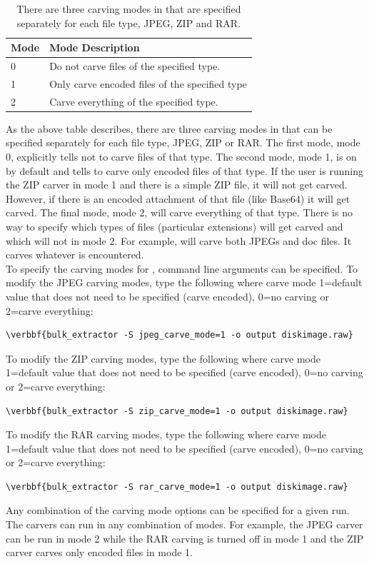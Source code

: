 \documentclass[11pt]{article} %
\begin{document}
\begin{table}[!ht]
\centering
\caption{There are three carving modes in \bulk that are specified separately for each file type, JPEG, ZIP and RAR.}
\label{tab:encodings}
\begin{tabular}{|m{2 cm}|m{7 cm}|}
\hline \hline
\textbf{Mode} & \textbf{Mode Description} \\
\hline
0 & Do not carve files of the specified type.\\
\hline
1 & Only carve encoded files of the specified type \\
\hline
2 & Carve everything of the specified type.\\
\hline
\end{tabular}
\end{table}

As the above table describes, there are three carving modes in \bulk that can be specified separately for each file type, JPEG, ZIP or RAR. The first mode, mode 0, explicitly tells \bulk not to carve files of that type. The second mode, mode 1, is on by default and tells \bulk to carve only encoded files of that type. If the user is running the ZIP carver in mode 1 and there is a simple ZIP file, it will not get carved. However, if there is an encoded attachment of that file (like Base64) it will get carved. The final mode, mode 2, will carve everything of that type. There is no way to specify which types of files (particular extensions) will get carved and which will not in mode 2. For example, \bulk will carve both JPEGs and doc files. It carves whatever is encountered.\\

To specify the carving modes for \bulk, command line arguments can be specified. To modify the JPEG carving modes, type the following where carve mode 1=default value that does not need to be specified (carve encoded), 0=no carving or 2=carve everything:
\begin{Verbatim}[commandchars=\\\{\}]
\verbbf{bulk_extractor -S jpeg_carve_mode=1 -o output diskimage.raw}
\end{Verbatim} 
To modify the ZIP carving modes, type the following  where carve mode 1=default value that does not need to be specified (carve encoded), 0=no carving or 2=carve everything:
\begin{Verbatim}[commandchars=\\\{\}]
\verbbf{bulk_extractor -S zip_carve_mode=1 -o output diskimage.raw}
\end{Verbatim} 
To modify the RAR carving modes, type the following  where carve mode 1=default value that does not need to be specified (carve encoded), 0=no carving or 2=carve everything:
\begin{Verbatim}[commandchars=\\\{\}]
\verbbf{bulk_extractor -S rar_carve_mode=1 -o output diskimage.raw}
\end{Verbatim} 
Any combination of the carving mode options can be specified for a given run. The carvers can run in any combination of modes. For example, the JPEG carver can be run in mode 2 while the RAR carving is turned off in mode 1 and the ZIP carver carves only encoded files in mode 1.\\
\end{document}
